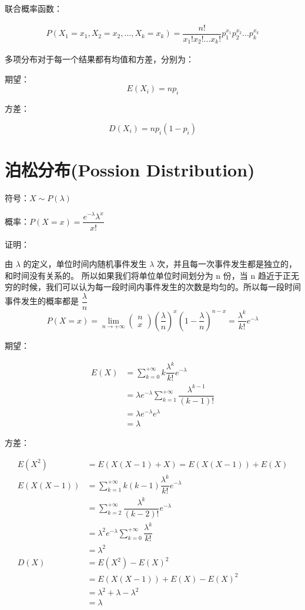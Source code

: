 \documentclass[12pt, a4paper, oneside]{ctexbook}
\begin{document}
联合概率函数：

\begin{align*}
    P(X_1 = x_1, X_2 = x_2, ..., X_k = x_k) = \dfrac{n!}{x_1!x_2!...x_k!} p_1^{x_1}p_2^{x_2}...p_{k}^{x_k}
\end{align*}

多项分布对于每一个结果都有均值和方差，分别为：

 期望：
$$
E(X_i) = np_i
$$

 方差：

$$
D(X_i) = np_i(1-p_i)
$$


\section{泊松分布(Possion Distribution)}

符号：$X\sim P(\lambda)$

概率：$P(X = x) = \dfrac{e^{-\lambda}\lambda^{x}}{x!}$

证明：

由 $\lambda$ 的定义，单位时间内随机事件发生 $\lambda$ 次，并且每一次事件发生都是独立的，和时间没有关系的。
所以如果我们将单位单位时间划分为 n 份，当 n 趋近于正无穷的时候，我们可以认为每一段时间内事件发生的次数是均匀的。所以每一段时间事件发生的概率都是 $\dfrac{\lambda}{n}$
$$
P(X = x) = \lim\limits_{n \to +\infty}\begin{pmatrix} n \\ x\end{pmatrix} (\dfrac{\lambda}{n})^{x}(1 - \dfrac{\lambda}{n})^{n - x} = \dfrac{\lambda^{k}}{k!}e^{-\lambda}
$$

期望：

$$
\begin{aligned}
E(X) &= \sum\limits_{k=0}^{+\infty} k \dfrac{\lambda^{k}}{k!}e^{-\lambda} \\
&= \lambda e^{-\lambda} \sum\limits_{k = 1}^{+\infty} \dfrac{\lambda^{k - 1}}{(k - 1)!} \\
&= \lambda e^{-\lambda} e^{\lambda} \\
&= \lambda
\end{aligned}
$$

方差：

\begin{align*}
E(X^{2}) &= E(X(X - 1) + X) = E(X(X-1)) + E(X) \\
E(X(X - 1)) &= \sum\limits_{k = 1}^{+\infty} k(k - 1) \dfrac{\lambda^{k}}{k!}e^{-\lambda} \\&=\sum\limits_{k = 2}^{+\infty}\dfrac{\lambda^{k}}{(k - 2)!}e^{-\lambda} \\
&= \lambda^{2}e^{-\lambda}\sum\limits_{k = 0}^{+\infty}\dfrac{\lambda^{k}}{k!}\\&= \lambda^{2}\\D(X) &= E(X^{2}) - E(X)^{2} \\&= E(X(X - 1)) + E(X) - E(X)^{2} \\&= \lambda^{2} + \lambda - \lambda^{2}\\&= \lambda
\end{align*}
\end{document}
